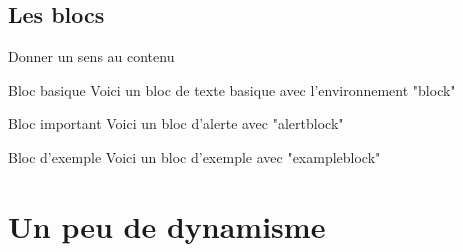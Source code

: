 \documentclass[8pt]{beamer}
\begin{document}
\subsection{Les blocs}
	\begin{frame}{Donner un sens au contenu}
		\begin{block}{Bloc basique}
			Voici un bloc de texte basique avec l'environnement "block"
		\end{block}
		\begin{alertblock}{Bloc important}
			Voici un bloc d'alerte avec "alertblock"
		\end{alertblock}
		\begin{exampleblock}{Bloc d'exemple}
			Voici un bloc d'exemple avec "exampleblock"
		\end{exampleblock}
	\end{frame}

\section{Un peu de dynamisme}
	\begin{frame}
		\tableofcontents[currentsection]
	\end{frame}
\end{document}
